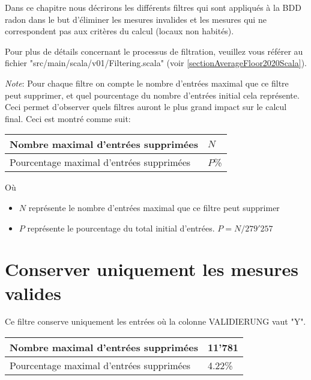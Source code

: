 \newcommand{\nbEntreesAvantFiltration}{279'257}
\newcommand{\nbEntreesApresFiltration}{168'056}
\newcommand{\nbEntreesSupprParFiltration}{111'201}


\newcommand\filterProps[2]{
\begin{table}[H]
\centering
\begin{tabular}{|l|l|}
\hline
Nombre maximal d'entrées supprimées & #1   \\ \hline
Pourcentage maximal d'entrées supprimées & #2\% \\ \hline
\end{tabular}
\end{table}
}


Dans ce chapitre nous décrirons les différents filtres qui sont appliqués à la BDD radon dans le but d'éliminer les mesures invalides et les mesures qui ne correspondent pas aux critères du calcul (locaux non habités).

Pour plus de détails concernant le processus de filtration, veuillez vous référer au fichier "src/main/scala/v01/Filtering.scala" (voir \ref{sectionAverageFloor2020Scala}).

\textit{Note}: Pour chaque filtre on compte le nombre d'entrées maximal que ce filtre peut supprimer, et quel pourcentage du nombre d'entrées initial cela représente. Ceci permet d'observer quels filtres auront le plus grand impact sur le calcul final. Ceci est montré comme suit:
\filterProps{$N$}{$P$}

Où
\begin{itemize}
\item $N$ représente le nombre d'entrées maximal que ce filtre peut supprimer
\item $P$ représente le pourcentage du total initial d'entrées. $P = N / \nbEntreesAvantFiltration $
\end{itemize}

\section{Conserver uniquement les mesures valides}
Ce filtre conserve uniquement les entrées où la colonne VALIDIERUNG vaut "Y".

\filterProps{11'781}{4.22}


